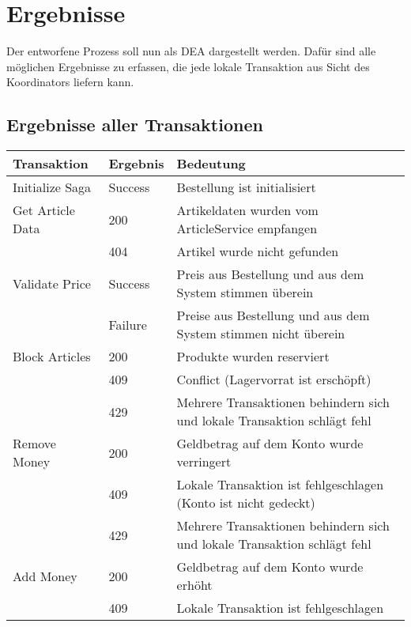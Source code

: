 \section{Ergebnisse}
Der entworfene Prozess soll nun als DEA dargestellt werden. Dafür sind alle möglichen Ergebnisse zu erfassen, die jede lokale Transaktion aus Sicht des Koordinators liefern kann. 

\subsection{Ergebnisse aller Transaktionen}
\begin{center}
	\begin{longtable}[h]{|p{3cm}|p{1.5cm}|p{11cm}|}
		\hline
		Transaktion	& Ergebnis & Bedeutung \\ \hline
		Initialize Saga 	& Success 	& Bestellung ist initialisiert \\ \hline
		Get Article Data	& 200 		& Artikeldaten wurden vom ArticleService empfangen \\
		& 404 		& Artikel wurde nicht gefunden \\ \hline
		Validate Price 		& Success 	& Preis aus Bestellung und aus dem System stimmen überein \\
		& Failure 	& Preise aus Bestellung und aus dem System stimmen nicht überein \\ \hline
		Block Articles		& 200		& Produkte wurden reserviert \\
		& 409 		& Conflict (Lagervorrat ist erschöpft) \\
		& 429 		& Mehrere Transaktionen behindern sich und lokale Transaktion schlägt fehl \\ \hline
		Remove Money 		& 200		& Geldbetrag auf dem Konto wurde verringert \\
		& 409		& Lokale Transaktion ist fehlgeschlagen (Konto ist nicht gedeckt) \\
		& 429		& Mehrere Transaktionen behindern sich und lokale Transaktion schlägt fehl \\ \hline
		Add Money 			& 200		& Geldbetrag auf dem Konto wurde erhöht \\
		& 409		& Lokale Transaktion ist fehlgeschlagen \\

\end{longtable}
\end{center}

